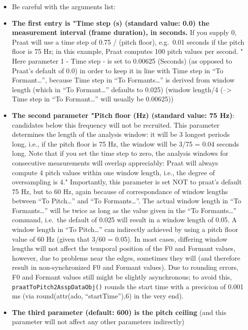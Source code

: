\documentclass[]{book}
\providecommand{\tightlist}{%
  \setlength{\itemsep}{0pt}\setlength{\parskip}{0pt}}
\begin{document}
\begin{itemize}
\tightlist
\item
  Be careful with the arguments list:
\item
  \textbf{The first entry is "Time step (s) (standard value: 0.0) the measurement interval (frame duration), in seconds.}
  If you supply 0, Praat will use a time step of 0.75 / (pitch floor), e.g.~0.01 seconds if the pitch floor is 75 Hz;
  in this example, Praat computes 100 pitch values per second. "
  Here parameter 1 - Time step - is set to 0.00625 (Seconds) (as opposed to Praat's default of 0.0) in order
  to keep it in line with Time step in ``To Formant\ldots{}'',
  because Time step in ``To Formants\ldots{}'' is derived from
  window length (which in ``To Formant\ldots{}'' defaults to 0.025) (window length/4 (--\textgreater{} Time step in ``To Formant\ldots{}''
  will usually be 0.00625))
\item
  \textbf{The second parameter "Pitch floor (Hz) (standard value: 75 Hz)}:
  candidates below this frequency will not be recruited.
  This parameter determines the length of the analysis window: it will be 3 longest periods long, i.e.,
  if the pitch floor is 75 Hz, the window will be 3/75 = 0.04 seconds long.
  Note that if you set the time step to zero, the analysis windows for consecutive measurements will overlap appreciably:
  Praat will always compute 4 pitch values within one window length, i.e., the degree of oversampling is 4."
  Importantly, this parameter is set NOT to praat's default 75 Hz, but to 60 Hz, again because of correspondance
  of window lengths between ``To Pitch\ldots{}'' and ``To Formants\ldots{}''. The actual window length in ``To Formants\ldots{}'' will be twice as long
  as the value given in the ``To Formants\ldots{}'' command, i.e.~the default of 0.025 will result in a window length of 0.05.
  A window length in ``To Pitch\ldots{}'' can indirectly achieved by using a pitch floor value of 60 Hz (given that 3/60 = 0.05).
  In most cases, differing window lengths will not affect the temporal position of the F0 and Formant values, however, due
  to problems near the edges, sometimes they will (and therefore result in non-synchronized F0 and Formant values).
  Due to rounding errors, F0 and Formant values still might be slightly asynchronous; to avoid this, \texttt{praatToPitch2AsspDataObj()}
  rounds the start time with a precicion of 0.001 ms (via round(attr(ado, ``startTime''),6) in the very end).
\item
  \textbf{The third parameter (default: 600) is the pitch ceiling} (and this parameter will not affect any other parameters indirectly)
\end{itemize}
\end{document}
